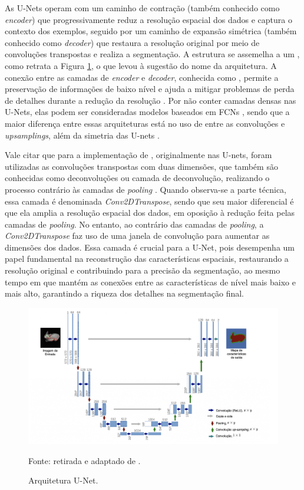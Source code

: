 As U-Nets operam com um caminho de contração (também conhecido como \textit{encoder}) que progressivamente reduz a resolução espacial dos dados e captura o contexto dos exemplos, seguido por um caminho de expansão simétrica (também conhecido como \textit{decoder}) que restaura a resolução original por meio de convoluções transpostas e realiza a segmentação. A estrutura se assemelha a um , como retrata a Figura \ref{semantic:fig:unet}, o que levou à sugestão do nome da arquitetura. A conexão entre as camadas de \textit{encoder} e \textit{decoder}, conhecida como , permite a preservação de informações de baixo nível e ajuda a mitigar problemas de perda de detalhes durante a redução da resolução \citep{Minaee2021, Minaee2021DeepClassification}. Por não conter camadas densas nas U-Nets, elas podem ser consideradas modelos baseados em FCNs \citep{Minaee2021}, sendo que a maior diferença entre essas arquiteturas está no uso de  entre as convoluções e \textit{upsamplings}, além da simetria das U-nets \citep{OZTURK2020ComparisonImageries}.

Vale citar que para a implementação de , originalmente nas U-nets, foram utilizadas as convoluções transpostas com duas dimensões, que também são conhecidas como deconvoluções ou camada de deconvolução, realizando o processo contrário às camadas de \textit{pooling} \citep{Zeiler2014Visualizing2013}. Quando observa-se a parte técnica, essa camada é denominada \textit{Conv2DTranspose}, sendo que seu maior diferencial é que  ela amplia a resolução espacial dos dados, em oposição à redução feita pelas camadas de \textit{pooling}. No entanto, ao contrário das camadas de \textit{pooling}, a \textit{Conv2DTranspose} faz uso de uma janela de convolução para aumentar as dimensões dos dados. Essa camada é crucial para a U-Net, pois desempenha um papel fundamental na reconstrução das características espaciais, restaurando a resolução original e contribuindo para a precisão da segmentação, ao mesmo tempo em que mantém as conexões entre as características de nível mais baixo e mais alto, garantindo a riqueza dos detalhes na segmentação final.

\begin{figure}[H]
    \centering
    \caption{Arquitetura U-Net.}
    \includegraphics[width=1\linewidth]{recursos/imagens/semantic/unet-arch.png}
    \label{semantic:fig:unet}

    Fonte: retirada e adaptado de \cite{Ronneberger2015U-net:Segmentation}.
\end{figure}

